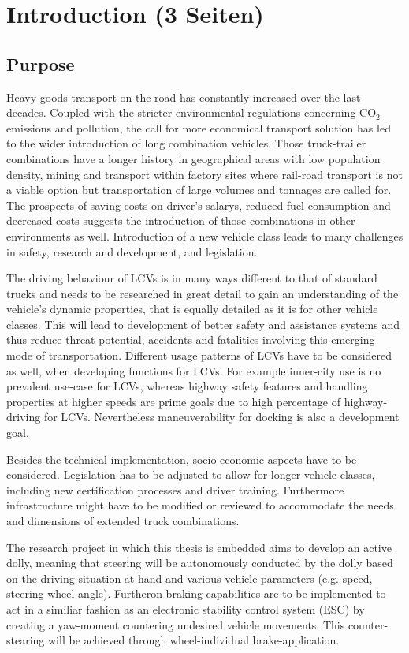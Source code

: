 \documentclass[ExampleMasters.tex]{subfiles}
\begin{document}
\clearpage	
\chapter{Introduction (3 Seiten)}
\label{chap:introduction}

\section{Purpose}
\label{sec:purpose}
Heavy goods-transport on the road has constantly increased over the last decades. Coupled with the stricter environmental regulations concerning CO$_{2}$-emissions and pollution, the call for more economical transport solution has led to the wider introduction of long combination vehicles. Those truck-trailer combinations have a longer history in geographical areas with low population density, mining and transport within factory sites where rail-road transport is not a viable option but transportation of large volumes and tonnages are called for. The prospects of saving costs on driver's salarys, reduced fuel consumption and decreased costs suggests the introduction of those combinations in other environments as well. Introduction of a new vehicle class leads to many challenges in safety, research and development, and legislation. 

The driving behaviour of LCVs is in many ways different to that of standard trucks and needs to be researched in great detail to gain an understanding of the vehicle's dynamic properties, that is equally detailed as it is for other vehicle classes. This will lead to development of better safety and assistance systems and thus reduce threat potential, accidents and fatalities involving this emerging mode of transportation. Different usage patterns of LCVs have to be considered as well, when developing functions for LCVs. For example inner-city use is no prevalent use-case for LCVs, whereas highway safety features and handling properties at higher speeds are prime goals due to high percentage of highway-driving for LCVs. Nevertheless maneuverability for docking is also a development goal.

Besides the technical implementation, socio-economic aspects have to be considered. Legislation has to be adjusted to allow for longer vehicle classes, including new certification processes and driver training. Furthermore infrastructure might have to be modified or reviewed to accommodate the needs and dimensions of extended truck combinations.

The research project in which this thesis is embedded aims to develop an active dolly, meaning that steering will be autonomously conducted by the dolly based on the driving situation at hand and various vehicle parameters (e.g. speed, steering wheel angle). Furtheron braking capabilities are to be implemented to act in a similiar fashion as an electronic stability control system (ESC) by creating a yaw-moment countering undesired vehicle movements. This counter-stearing will be achieved through wheel-individual brake-application. 
\end{document}
